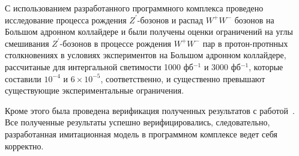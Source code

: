 С использованием разработанного программного комплекса проведено исследование процесса рождения ${Z}^{\prime}$-бозонов и распад ${W}^{+}{W}^{-}$ бозонов на Большом адронном коллайдере и были получены оценки ограничений на углы смешивания ${Z}^{\prime}$-бозонов в
процессе рождения ${W}^{+}$${W}^{-}$ пар в протон-протнных столкновениях
в условиях экспериментов на Большом адронном коллайдере, рассчитаные для интергальной светимости 1000 фб${}^{-1}$ и 3000 фб${}^{-1}$, которые составили  ${10}^{-4}$ и $6\times{10}^{-5}$, соответственно, и существенно превышают существующие экспериментальные ограничения.

Кроме этого была проведена верификация полученных результатов с
работой~\cite{2part-pankov}. Все полученные результаты успешно верифицировались,
следовательно, разработанная имитационная модель в программном комплексе
ведет себя корректно.